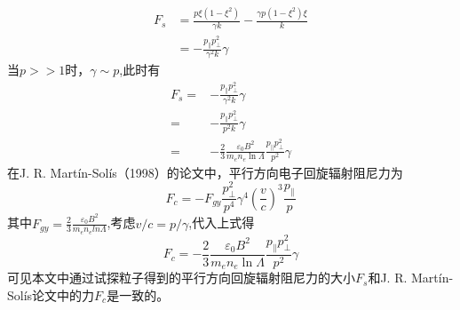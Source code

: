 \begin{align}
F_{s} & = \frac{p \xi\left(1-\xi^{2}\right)}{\gamma k}-\frac{\gamma p\left(1-\xi^{2}\right) \xi}{k} \\& = -\frac{p_{\|} p_{\perp}^{2}}{\gamma^{2} k} \gamma\
\end{align}
当$p>>1$时，$γ\sim p$,此时有
\begin{equation}
\begin{aligned}
F_{s}  = &-\frac{p_{\|} p_{\perp}^{2}}{\gamma^{2} k} \gamma \\ 
 =& -\frac{p_{\|} p_{\perp}^{2}}{p^{2} k} \gamma  \\ 
 =& -\frac{2}{3} \frac{\varepsilon_{0} B^{2}}{m_{e} n_{e} \ln \Lambda} \frac{p_{\|} p_{\perp}^{2}}{p^{2}} \gamma
\end{aligned}
\end{equation}
在J. R. Martín-Solís（1998）\cite{RN874}的论文中，平行方向电子回旋辐射阻尼力为
\begin{equation}
F_{c}=-F_{g y} \frac{p_{\perp}^{2}}{p^{4}} \gamma^{4}\left(\frac{v}{c}\right)^{3} \frac{p_{\|}}{p}
\end{equation}
其中$F_{gy}=\frac{2}{3}\frac{ε_0 B^2}{m_e n_e lnΛ}$,考虑$v/c=p/γ$,代入上式得
\begin{equation}
F_{c}=-\frac{2}{3} \frac{\varepsilon_{0} B^{2}}{m_{e} n_{e} \ln \Lambda} \frac{p_{\|} p_{\perp}^{2}}{p^{2}} \gamma
\end{equation}
可见本文中通过试探粒子得到的平行方向回旋辐射阻尼力的大小$F_s$和J. R. Martín-Solís论文中的力$F_c$是一致的。

